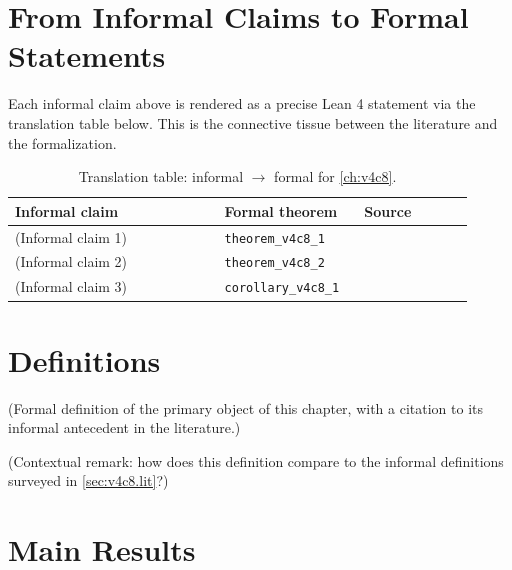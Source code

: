         \section{From Informal Claims to Formal Statements}
        \label{sec:v4c8.bridge}

        Each informal claim above is rendered as a precise Lean 4 statement
        via the translation table below.  This is the connective tissue
        between the literature and the formalization.

        \begin{table}[ht]
        \centering
        \begin{tabular}{p{0.42\linewidth} p{0.28\linewidth} p{0.22\linewidth}}
        \toprule
        \textbf{Informal claim} & \textbf{Formal theorem} & \textbf{Source} \\
        \midrule
        (Informal claim 1) & \texttt{theorem\_v4c8\_1} & \cite{lean4_tpil} \\
        (Informal claim 2) & \texttt{theorem\_v4c8\_2} & \cite{mathlib4} \\
        (Informal claim 3) & \texttt{corollary\_v4c8\_1} & \cite{mac_lane_1998} \\
        \bottomrule
        \end{tabular}
        \caption{Translation table: informal $\rightarrow$ formal for
        \cref{ch:v4c8}.}
        \label{tab:v4c8.bridge}
        \end{table}

        \section{Definitions}

        \begin{definition}
        \label{def:v4c8.1}
          (Formal definition of the primary object of this chapter, with
          a citation to its informal antecedent in the literature.)
        \end{definition}

        \begin{remark}
          (Contextual remark: how does this definition compare to the
          informal definitions surveyed in
          \cref{sec:v4c8.lit}?)
        \end{remark}

        \section{Main Results}

